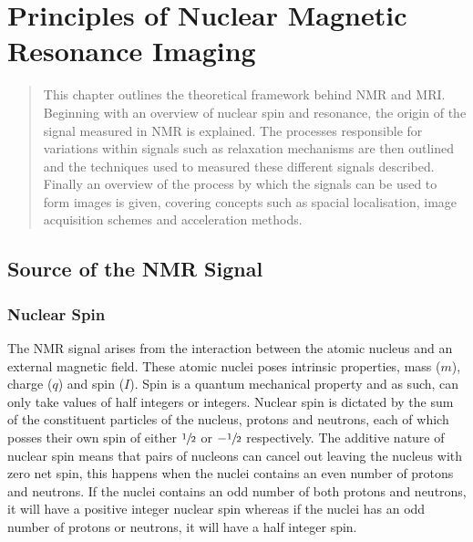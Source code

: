 \chapter{Principles of Nuclear Magnetic Resonance Imaging}
\label{chap:Theory}
\newpage
\begin{abstract}
	This chapter outlines the theoretical framework behind \ac*{NMR} and \ac*{MRI}. Beginning with an overview of nuclear spin and resonance, the origin of the signal measured in \ac{NMR} is explained. The processes responsible for variations within signals such as relaxation mechanisms are then outlined and the techniques used to measured these different signals described. Finally an overview of the process by which the signals can be used to form images is given, covering concepts such as spacial localisation, image acquisition schemes and acceleration methods.
\end{abstract}
\newpage

\section{Source of the NMR Signal}
\label{sec:theory_source_of_nmr}

\subsection{Nuclear Spin}
\label{subsec:theory_nuclear_spin}
The \ac{NMR} signal arises from the interaction between the atomic nucleus and an external magnetic field. These atomic nuclei poses intrinsic properties, mass ($m$), charge ($q$) and spin ($I$). Spin is a quantum mechanical property and as such, can only take values of half integers or integers. Nuclear spin is dictated by the sum of the constituent particles of the nucleus, protons and neutrons, each of which posses their own spin of either $\sfrac{1}{2}$ or $-\sfrac{1}{2}$ respectively. The additive nature of nuclear spin means that pairs of nucleons can cancel out leaving the nucleus with zero net spin, this happens when the nuclei contains an even number of protons and neutrons. If the nuclei contains an odd number of both protons and neutrons, it will have a positive integer nuclear spin whereas if the nuclei has an odd number of protons or neutrons, it will have a half integer spin. 


